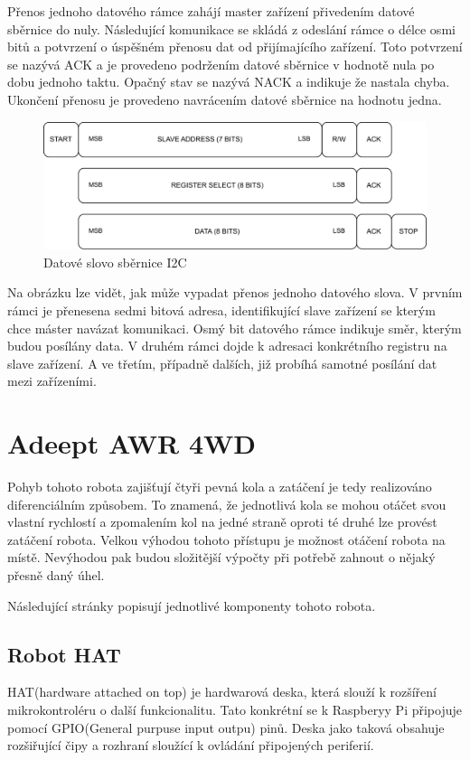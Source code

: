 Přenos jednoho datového rámce zahájí master zařízení přivedením datové sběrnice do nuly. Následující komunikace se skládá z odeslání rámce o délce osmi bitů a potvrzení o úspěšném přenosu dat od přijímajícího zařízení. Toto potvrzení se nazývá ACK a je provedeno podržením datové sběrnice v hodnotě nula po dobu jednoho taktu. Opačný stav se nazývá NACK a indikuje že nastala chyba. Ukončení přenosu je provedeno navrácením datové sběrnice na hodnotu jedna. \cite{um10204}

\begin{figure}[h!]
	\centering
	\includegraphics[scale=0.75]{obrazky-figures/i2c_data_word.pdf}
	\caption{Datové slovo sběrnice I2C}
	\label{}
\end{figure}

Na obrázku lze vidět, jak může vypadat přenos jednoho datového slova. V prvním rámci je přenesena sedmi bitová adresa, identifikující slave zařízení se kterým chce máster navázat komunikaci. Osmý bit datového rámce indikuje směr, kterým budou posílány data. V druhém rámci dojde k adresaci konkrétního registru na slave zařízení. A ve třetím, případně dalších, již probíhá samotné posílání dat mezi zařízeními. \cite{an4481}

\section{Adeept AWR 4WD}
Pohyb tohoto robota zajišťují čtyři pevná kola a zatáčení je tedy realizováno diferenciálním způsobem. To znamená, že jednotlivá kola se mohou otáčet svou vlastní rychlostí a zpomalením kol na jedné straně oproti té druhé lze provést zatáčení robota. Velkou výhodou tohoto přístupu je možnost otáčení robota na místě. Nevýhodou pak budou složitější výpočty při potřebě zahnout o nějaký přesně daný úhel.

\noindent Následující stránky popisují jednotlivé komponenty tohoto robota.

\subsection*{Robot HAT}
HAT(hardware attached on top) je hardwarová deska, která slouží k rozšíření mikrokontroléru o další funkcionalitu. Tato konkrétní se k Raspberyy Pi připojuje pomocí GPIO(General purpuse input outpu) pinů. Deska jako taková obsahuje rozšiřující čipy a rozhraní sloužící k ovládání připojených periferií.

